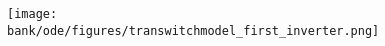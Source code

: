 \begin{figure}[H]
  \begin{center}
    \texttt{[image: \\bank/ode/figures/transwitchmodel\_first\_inverter.png]}
  \end{center}
  \label{fig:inverter0}
\end{figure}
